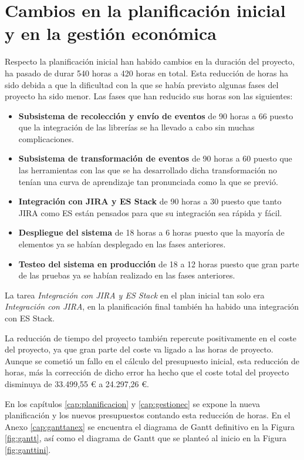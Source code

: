 \section{Cambios en la planificación inicial y en la gestión económica}

Respecto la planificación inicial han habido cambios en la duración del proyecto, ha pasado de durar 540 horas a 420 horas en total. Esta reducción de horas ha sido debida a que la dificultad con la que se había previsto algunas fases del proyecto ha sido menor. Las fases que han reducido sus horas son las siguientes:

\begin{itemize}
	\item \textbf{Subsistema de recolección y envío de eventos} de 90 horas a 66 puesto que la integración de las librerías se ha llevado a cabo sin muchas complicaciones.
	
	\item \textbf{Subsistema de transformación de eventos} de 90 horas a 60 puesto que las herramientas con las que se ha desarrollado dicha transformación no tenían una curva de aprendizaje tan pronunciada como la que se previó.
	
	\item \textbf{Integración con JIRA y ES Stack} de 90 horas a 30 puesto que tanto JIRA como ES están pensados para que su integración sea rápida y fácil.
	
	\item \textbf{Despliegue del sistema} de 18 horas a 6 horas puesto que la mayoría de elementos ya se habían desplegado en las fases anteriores.
	
	\item \textbf{Testeo del sistema en producción} de 18 a 12 horas puesto que gran parte de las pruebas ya se habían realizado en las fases anteriores.
\end{itemize}

La tarea \textit{Integración con JIRA y ES Stack} en el plan inicial tan solo era \textit{Integración con JIRA}, en la planificación final también ha habido una integración con ES Stack.

La reducción de tiempo del proyecto también repercute positivamente en el coste del proyecto, ya que gran parte del coste va ligado a las horas de proyecto. Aunque se cometió un fallo en el cálculo del presupuesto inicial, esta reducción de horas, más la corrección de dicho error ha hecho que el coste total del proyecto disminuya de 33.499,55 € a 24.297,26 €.

En los capítulos \ref{cap:planificacion} y \ref{cap:gestionec} se expone la nueva planificación y los nuevos presupuestos contando esta reducción de horas. En el Anexo \ref{cap:ganttanex} se encuentra el diagrama de Gantt definitivo en la Figura \ref{fig:gantt}, así como el diagrama de Gantt que se planteó al inicio en la Figura \ref{fig:ganttini}.
